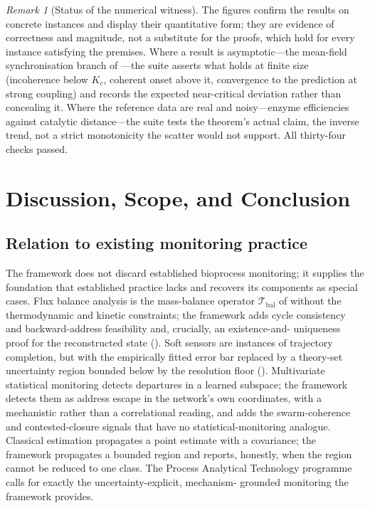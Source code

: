 \documentclass[11pt,twocolumn,a4paper]{article}
\theoremstyle{thmstyle}
\theoremstyle{definition}
\theoremstyle{remark}
\newtheorem{remark}[theorem]{Remark}
\begin{document}
\begin{remark}[Status of the numerical witness]
\label{rem:witness-status}
The figures confirm the results on concrete instances and display their
quantitative form; they are evidence of correctness and magnitude, not a
substitute for the proofs, which hold for every instance satisfying the
premises. Where a result is asymptotic---the mean-field synchronisation
branch of ---the suite asserts what holds at finite size
(incoherence below $K_c$, coherent onset above it, convergence to the
prediction at strong coupling) and records the expected near-critical
deviation rather than concealing it. Where the reference data are real and
noisy---enzyme efficiencies against catalytic distance---the suite tests the
theorem's actual claim, the inverse trend, not a strict monotonicity the
scatter would not support. All thirty-four checks passed.
\end{remark}


\section{Discussion, Scope, and Conclusion}
\label{sec:discussion}

\subsection{Relation to existing monitoring practice}

The framework does not discard established bioprocess monitoring; it
supplies the foundation that established practice lacks and recovers its
components as special cases. Flux balance analysis
\citep{orth2010fba} is the mass-balance operator
$\mathcal{T}_{\mathrm{bal}}$ of  without the
thermodynamic and kinetic constraints; the framework adds cycle consistency
and backward-address feasibility and, crucially, an existence-and-
uniqueness proof for the reconstructed state ().
Soft sensors \citep{luttmann2012soft,mandenius2015bioprocess} are
instances of trajectory completion, but with the empirically fitted error
bar replaced by a theory-set uncertainty region bounded below by the
resolution floor (). Multivariate statistical monitoring
\citep{wold1987principal,qin2012survey} detects departures in a learned
subspace; the framework detects them as address escape in the network's own
coordinates, with a mechanistic rather than a correlational reading, and
adds the swarm-coherence and contested-closure signals that have no
statistical-monitoring analogue. Classical estimation
\citep{kalman1960new} propagates a point estimate with a covariance; the
framework propagates a bounded region and reports, honestly, when the region
cannot be reduced to one class. The Process Analytical Technology programme
\citep{fda2004pat} calls for exactly the uncertainty-explicit, mechanism-
grounded monitoring the framework provides.
\end{document}
